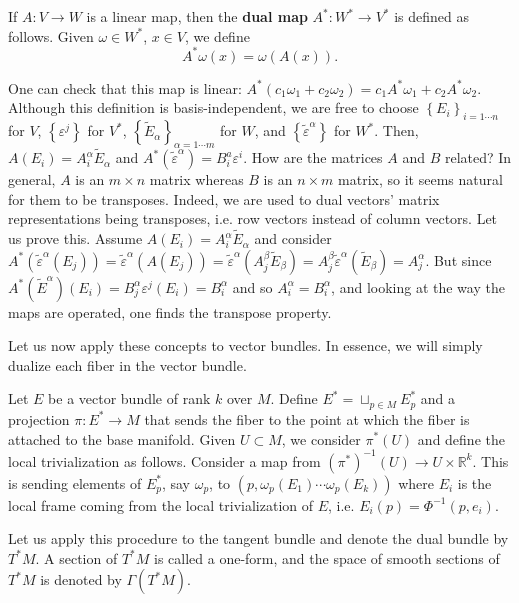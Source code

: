 \documentclass{../mathnotes}
\begin{document}
\begin{defn}
    If $A:V\to W$ is a linear map, then the \textbf{dual map} $A^*:W^*\to V^*$ is defined as follows. Given $\omega\in W^*$, $x\in V$,
    we define \[A^*\omega(x)=\omega(A(x)).\]
\end{defn}

One can check that this map is linear: $A^*(c_1\omega_1+c_2\omega_2)=c_1A^*\omega_1+c_2A^*\omega_2$. Although this definition
is basis-independent, we are free to choose $\left\{ E_i \right\}_{i=1\cdots n}$ for $V$, $\left\{ \varepsilon^j \right\}$ for $V^*$,
$\left\{ \tilde{E}_\alpha \right\}_{\alpha=1\cdots m}$ for $W$, and $\left\{ \tilde{\varepsilon}^\alpha\right\}$ for $W^*$.
Then, $A(E_i)=A_i^\alpha\tilde{E}_\alpha$ and $A^*(\tilde{\varepsilon}^\alpha)=B^a_i\varepsilon^i$. How are the matrices $A$ and $B$
related? In general, $A$ is an $m\times n$ matrix whereas $B$ is an $n\times m$ matrix, so it seems natural for them to be transposes.
Indeed, we are used to dual vectors' matrix representations being transposes, i.e. row vectors instead of column vectors. Let us prove
this. Assume $A(E_i)=A_i^\alpha\tilde{E}_\alpha$ and consider $A^*(\tilde{\varepsilon}^\alpha(E_j))=\tilde{\varepsilon}^\alpha(A(E_j))
=\tilde{\varepsilon}^\alpha(A_j^\beta\tilde{E}_\beta)=A_j^\beta\tilde{\varepsilon}^\alpha(\tilde{E}_\beta)=A_j^\alpha$. But since
$A^*(\tilde{E}^\alpha)(E_i)=B_j^\alpha\varepsilon^j(E_i)=B_i^\alpha$ and so $A_i^\alpha=B_i^\alpha$, and looking at the way the maps
are operated, one finds the transpose property.

Let us now apply these concepts to vector bundles. In essence, we will simply dualize each fiber in the vector bundle.

\begin{defn}
    Let $E$ be a vector bundle of rank $k$ over $M$. Define $E^*=\sqcup_{p\in M}E_p^*$ and a projection $\pi:E^*\to M$ that sends
    the fiber to the point at which the fiber is attached to the base manifold. Given $U\subset M$, we consider $\pi^*(U)$ and
    define the local trivialization as follows. Consider a map from $(\pi^*)^{-1}(U)\to U\times \mathbb{R}^k$. This is sending elements
    of $E_p^*$, say $\omega_p$, to $(p, \omega_p(E_1) \cdots \omega_p(E_k))$ where $E_i$ is the local frame coming from the local trivialization
    of $E$, i.e. $E_i(p)=\Phi^{-1}(p,e_i)$.
\end{defn}

Let us apply this procedure to the tangent bundle and denote the dual bundle by $T^*M$. A section of $T^*M$ is called a one-form,
and the space of smooth sections of $T^*M$ is denoted by $\Gamma(T^*M)$.
\end{document}
